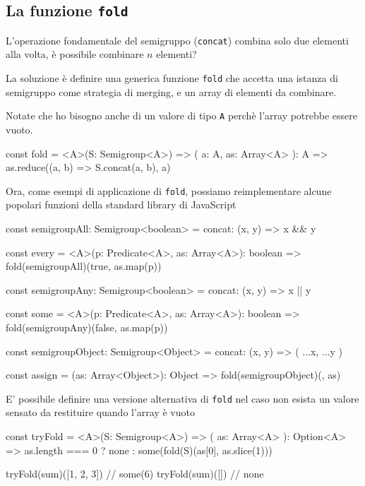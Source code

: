 \documentclass[12pt]{article}
\theoremstyle{definition}
\newenvironment{code}
  {\vspace{0.5cm} \VerbatimEnvironment\begin{typescriptcode}}
  {\end{typescriptcode} \vspace{0.2cm}}
\begin{document}
\subsection{La funzione \texttt{fold}}

L'operazione fondamentale del semigruppo (\texttt{concat}) combina solo due elementi alla volta, è possibile combinare $n$ elementi?

La soluzione è definire una generica funzione \texttt{fold} che accetta una istanza di semigruppo come strategia di merging, e un array
di elementi da combinare.

Notate che ho bisogno anche di un valore di tipo \texttt{A} perchè l'array potrebbe essere vuoto.

\begin{code}
const fold = <A>(S: Semigroup<A>) => (
  a: A,
  as: Array<A>
): A => as.reduce((a, b) => S.concat(a, b), a)
\end{code}

Ora, come esempi di applicazione di \texttt{fold}, possiamo reimplementare alcune popolari funzioni della standard library di JavaScript

\begin{code}
const semigroupAll: Semigroup<boolean> = {
  concat: (x, y) => x && y
}

const every = <A>(p: Predicate<A>, as: Array<A>): boolean =>
  fold(semigroupAll)(true, as.map(p))
\end{code}

\begin{code}
const semigroupAny: Semigroup<boolean> = {
  concat: (x, y) => x || y
}

const some = <A>(p: Predicate<A>, as: Array<A>): boolean =>
  fold(semigroupAny)(false, as.map(p))
\end{code}

\begin{code}
const semigroupObject: Semigroup<Object> = {
  concat: (x, y) => ({ ...x, ...y })
}

const assign = (as: Array<Object>): Object =>
  fold(semigroupObject)({}, as)
\end{code}

E' possibile definire una versione alternativa di \texttt{fold} nel caso non esista un valore sensato da restituire quando l'array è vuoto

\begin{code}
const tryFold = <A>(S: Semigroup<A>) => (
  as: Array<A>
): Option<A> =>
  as.length === 0 ? none : some(fold(S)(as[0], as.slice(1)))

tryFold(sum)([1, 2, 3]) // some(6)
tryFold(sum)([]) // none
\end{code}
\end{document}
